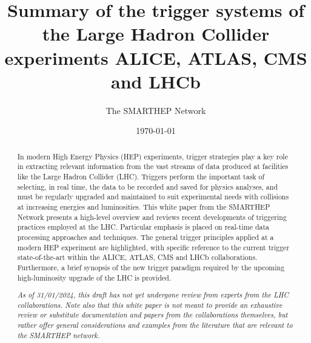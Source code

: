 \documentclass{smarthepnote}
\title{Summary of the trigger systems of the Large Hadron Collider experiments ALICE, ATLAS, CMS and LHCb}
\author{The SMARTHEP Network}
\date{\today}
\begin{document}
\maketitle

\begin{abstract}

In modern High Energy Physics (HEP) experiments, trigger strategies play a key role in extracting relevant information from the vast streams of data produced at facilities like the Large Hadron Collider (LHC). Triggers perform the important task of selecting, in real time, the data to be recorded and saved for physics analyses, and must be regularly upgraded and maintained to suit experimental needs with collisions at increasing energies and luminosities. This white paper from the SMARTHEP Network presents a high-level overview and reviews recent developments of triggering practices employed at the LHC. Particular emphasis is placed on real-time data processing approaches and techniques. The general trigger principles applied at a modern HEP experiment are highlighted, with specific reference to the current trigger state-of-the-art within the ALICE, ATLAS, CMS and LHCb collaborations. Furthermore, a brief synopsis of the new trigger paradigm required by the upcoming high-luminosity upgrade of the LHC is provided. 

\textit{As of 31/01/2024, this draft has not yet undergone review from experts from the LHC collaborations. Note also that this white paper is not meant to provide an exhaustive review or substitute documentation and papers from the collaborations themselves, but rather offer general considerations and examples from the literature that are relevant to the SMARTHEP  network.} 



\end{abstract}
\end{document}
